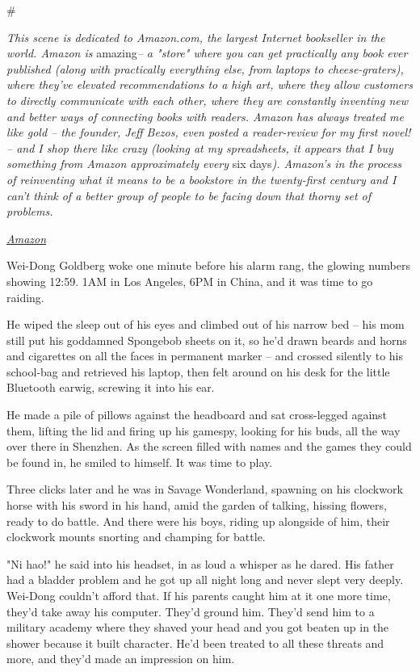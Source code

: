 \#

\emph{This scene is dedicated to Amazon.com, the largest Internet bookseller in the world. Amazon is}
amazing\emph{-- a "store" where you can get practically any book ever published (along with practically everything else, from laptops to cheese-graters), where they've elevated recommendations to a high art, where they allow customers to directly communicate with each other, where they are constantly inventing new and better ways of connecting books with readers. Amazon has always treated me like gold -- the founder, Jeff Bezos, even posted a reader-review for my first novel! -- and I shop there like crazy (looking at my spreadsheets, it appears that I buy something from Amazon approximately every}
six
days\emph{). Amazon's in the process of reinventing what it means to be a bookstore in the twenty-first century and I can't think of a better group of people to be facing down that thorny set of problems.}

\emph{\href{http://www.amazon.com/exec/obidos/ASIN/0765322161/downandoutint-20}{Amazon}}

Wei-Dong Goldberg woke one minute before his alarm rang, the
glowing numbers showing 12:59. 1AM in Los Angeles, 6PM in China,
and it was time to go raiding.

He wiped the sleep out of his eyes and climbed out of his narrow
bed -- his mom still put his goddamned Spongebob sheets on it, so
he'd drawn beards and horns and cigarettes on all the faces in
permanent marker -- and crossed silently to his school-bag and
retrieved his laptop, then felt around on his desk for the little
Bluetooth earwig, screwing it into his ear.

He made a pile of pillows against the headboard and sat
cross-legged against them, lifting the lid and firing up his
gamespy, looking for his buds, all the way over there in Shenzhen.
As the screen filled with names and the games they could be found
in, he smiled to himself. It was time to play.

Three clicks later and he was in Savage Wonderland, spawning on his
clockwork horse with his sword in his hand, amid the garden of
talking, hissing flowers, ready to do battle. And there were his
boys, riding up alongside of him, their clockwork mounts snorting
and champing for battle.

"Ni hao!" he said into his headset, in as loud a whisper as he
dared. His father had a bladder problem and he got up all night
long and never slept very deeply. Wei-Dong couldn't afford that. If
his parents caught him at it one more time, they'd take away his
computer. They'd ground him. They'd send him to a military academy
where they shaved your head and you got beaten up in the shower
because it built character. He'd been treated to all these threats
and more, and they'd made an impression on him.

